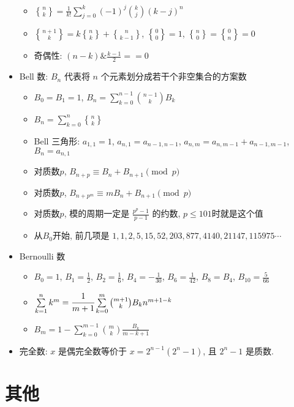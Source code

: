 \documentclass[landscape, twocolumn, 8pt, a4paper, twoside]{extarticle}
\newcommand{\stls}[2]{\genfrac{ \{ }{ \} }{0pt}{}{#1}{#2}}
\begin{document}
\begin{itemize}
    \begin{itemize}
    \item $\stls{n}{k} = \frac{1}{k!} \sum\limits_{j = 0}^{k} (-1)^j \binom{k}{j} (k - j)^n$
    \item $\stls{n + 1}{k} = k\stls{n}{k} + \stls{n}{k - 1}$, $\stls{0}{0} = 1$, $\stls{n}{0} = \stls{0}{n} = 0$
    \item 奇偶性: $(n - k) \& \frac{k - 1}{2} == 0$
    \end{itemize}
  \item Bell 数: $B_n$ 代表将 $n$ 个元素划分成若干个非空集合的方案数
    \begin{itemize}
    \item $B_0 = B_1 = 1$, $B_n = \sum\limits_{k = 0}^{n - 1} \binom{n - 1}{k} B_k$
    \item $B_n = \sum\limits_{k = 0}^{n} \stls{n}{k} $
    \item Bell 三角形: $a_{1, 1} = 1$, $a_{n, 1} = a_{n - 1, n - 1}$, $a_{n, m} = a_{n, m - 1} + a_{n - 1, m - 1}$, $B_n = a_{n, 1}$
    \item 对质数$p$, $B_{n + p} \equiv B_n + B_{n + 1} \pmod{p}$
    \item 对质数$p$, $B_{n + p^m} \equiv mB_n + B_{n + 1} \pmod{p}$
    \item 对质数$p$, 模的周期一定是 $\frac{p^p - 1}{p - 1}$ 的约数, $p \le 101$时就是这个值
    \item 从$B_0$开始, 前几项是 $1, 1, 2, 5, 15, 52, 203, 877, 4140, 21147, 115975 \cdots$
    \end{itemize}
  \item Bernoulli 数
    \begin{itemize}
    \item $B_0 = 1$, $B_1 = \frac{1}{2}$, $B_2 = \frac{1}{6}$, $B_4 = -\frac{1}{30}$, $B_6 = \frac{1}{42}$, $B_8 = B_4$, $B_{10} = \frac{5}{66}$
    \item $\sum\limits_{k = 1}^{n} k^m = \cfrac{1}{m + 1} \sum\limits_{k = 0}^{m} \binom{m + 1}{k} B_k n ^ {m + 1 - k} $
    \item $B_m = 1 - \sum\limits_{k = 0}^{m - 1} \binom{m}{k} \frac{B_k}{m - k + 1}$
    \end{itemize}
  \item 完全数: $x$ 是偶完全数等价于 $x = 2^{n - 1} (2^n - 1)$, 且 $2^n - 1$ 是质数.
  \end{itemize}

\section{其他}
\end{document}
